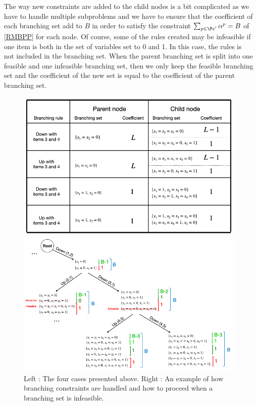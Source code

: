 The way new constraints are added to the child nodes is a bit complicated as we have to handle multiple subproblems and we have to ensure that the coefficient of each branching set add to $B$ in order to satisfy the constraint $\sum_{p \in \Pc'} \alpha^p = B$ of \eqref{RMBPP} for each node. Of course, some of the rules created may be infeasible if one item is both in the set of variables set to 0 and 1. In this case, the rules is not included in the branching set. When the parent branching set is split into one feasible and one infeasible branching set, then we only keep the feasible branching set and the coefficient of the new set is equal to the coefficient of the parent branching set.
\begin{figure}[!ht]
	\centering
	\begin{minipage}{0.47\linewidth}
		\centering
		\includegraphics[width=0.7\linewidth]{img/generic-branching.png}
	\end{minipage}
	\begin{minipage}{0.47\linewidth}
		\centering
		\includegraphics[width=\linewidth]{img/generic-example.png}
	\end{minipage}
	\caption{Left : The four cases presented above. Right : An example of how branching constraints are handled and how to proceed when a branching set is infeasible.}
\end{figure}

